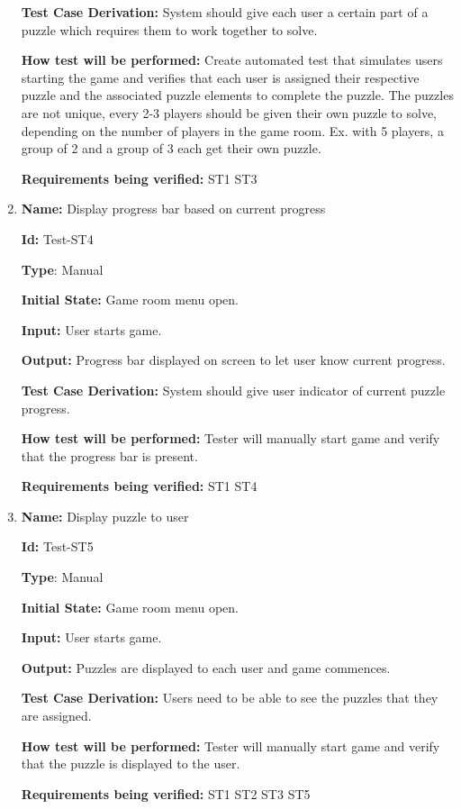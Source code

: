 \documentclass[12pt, titlepage]{article}
\begin{document}
\begin{enumerate}
\textbf{Test Case Derivation:} System should give each user a certain part of a puzzle which requires them to work together to solve.

\textbf{How test will be performed:} Create automated test that simulates users starting the game and verifies that each user is assigned their respective puzzle and the associated puzzle elements to complete the puzzle. The puzzles are not unique, every 2-3 players should be given their own puzzle to solve, depending on the number of players in the game room. Ex. with 5 players, a group of 2 and a group of 3 each get their own puzzle. 

\textbf{Requirements being verified: } ST1 ST3

\item{\textbf{Name:} Display progress bar based on current progress} \label{itm:Test-ST4}

\textbf{Id:} Test-ST4

\textbf{Type}: Manual

\textbf{Initial State:} Game room menu open.

\textbf{Input:} User starts game.

\textbf{Output:} Progress bar displayed on screen to let user know current progress.

\textbf{Test Case Derivation:} System should give user indicator of current puzzle progress.

\textbf{How test will be performed:} Tester will manually start game and verify that the progress bar is present.

\textbf{Requirements being verified: } ST1 ST4

\item{\textbf{Name:} Display puzzle to user} \label{itm:Test-ST5}

\textbf{Id:} Test-ST5

\textbf{Type}: Manual

\textbf{Initial State:} Game room menu open.

\textbf{Input:} User starts game.

\textbf{Output:} Puzzles are displayed to each user and game commences.

\textbf{Test Case Derivation:} Users need to be able to see the puzzles that they are assigned.

\textbf{How test will be performed:} Tester will manually start game and verify that the puzzle is displayed to the user.

\textbf{Requirements being verified: } ST1 ST2 ST3 ST5

\end{enumerate}
\end{document}
